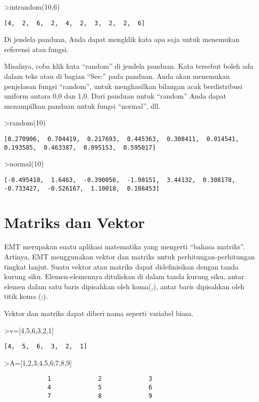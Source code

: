 \documentclass[
]{book}
\begin{document}
\textgreater intrandom(10,6)

\begin{verbatim}
[4,  2,  6,  2,  4,  2,  3,  2,  2,  6]
\end{verbatim}

Di jendela panduan, Anda dapat mengklik kata apa saja untuk menemukan referensi atau fungsi.

Misalnya, coba klik kata ``random'' di jendela panduan. Kata tersebut boleh ada dalam teks atau di bagian ``See:'' pada panduan. Anda akan menemukan penjelasan fungsi ``random'', untuk menghasilkan bilangan acak berdistribusi uniform antara 0,0 dan 1,0. Dari panduan untuk ``random'' Anda dapat menampilkan panduan untuk fungsi ``normal'', dll.

\textgreater random(10)

\begin{verbatim}
[0.270906,  0.704419,  0.217693,  0.445363,  0.308411,  0.914541,
0.193585,  0.463387,  0.095153,  0.595017]
\end{verbatim}

\textgreater normal(10)

\begin{verbatim}
[-0.495418,  1.6463,  -0.390056,  -1.98151,  3.44132,  0.308178,
-0.733427,  -0.526167,  1.10018,  0.108453]
\end{verbatim}

\chapter{Matriks dan Vektor}\label{matriks-dan-vektor}

EMT merupakan suatu aplikasi matematika yang mengerti ``bahasa matriks''. Artinya, EMT menggunakan vektor dan matriks untuk perhitungan-perhitungan tingkat lanjut. Suatu vektor atau matriks dapat didefinisikan dengan tanda kurung siku. Elemen-elemennya dituliskan di dalam tanda kurung siku, antar elemen dalam satu baris dipisahkan oleh koma(,), antar baris dipisahkan oleh titik koma (;).

Vektor dan matriks dapat diberi nama seperti variabel biasa.

\textgreater v={[}4,5,6,3,2,1{]}

\begin{verbatim}
[4,  5,  6,  3,  2,  1]
\end{verbatim}

\textgreater A={[}1,2,3;4,5,6;7,8,9{]}

\begin{verbatim}
            1             2             3 
            4             5             6 
            7             8             9 
\end{verbatim}
\end{document}

